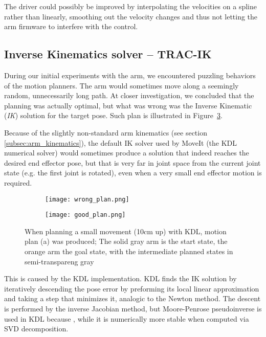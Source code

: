\documentclass[buriama8_dp.tex]{subfiles}
\begin{document}
The driver could possibly be improved by interpolating the velocities on a spline rather than linearly, smoothing out the velocity changes and thus not letting the arm firmware to interfere with the control.

\subsection{Inverse Kinematics solver -- TRAC-IK}
\label{subsec:tracik}

During our initial experiments with the arm, we encountered puzzling behaviors of the motion planners. The arm would sometimes move along a seemingly random, unnecessarily long path. At closer investigation, we concluded that the planning was actually optimal, but what was wrong was the Inverse Kinematic (\emph{IK}) solution for the target pose. Such plan is illustrated in Figure~\ref{fig:wrong_planning}.

Because of the slightly non-standard arm kinematics (see section \ref{subsec:arm_kinematics}), the default IK solver used by MoveIt (the KDL numerical solver) would sometimes produce a solution that indeed reaches the desired end effector pose, but that is very far in joint space from the current joint state (e.g. the first joint is rotated), even when a very small end effector motion is required.

\begin{figure}[htp]
  \centering
  \begin{subfigure}[t]{0.49\textwidth}
    \texttt{[image: wrong\_plan.png]}
    \caption{}
    \label{fig:wron_plan}
  \end{subfigure}
  \begin{subfigure}[t]{0.49\textwidth}
    \texttt{[image: good\_plan.png]}
    \caption{}
    \label{fig:wrong_joint}
  \end{subfigure}

  \caption[Non-optimal motion plan]{When planning a small movement (10cm up) with KDL, motion plan (a) was produced;  The solid gray arm is the start state, the orange arm the goal state, with the intermediate planned states in semi-transpareng gray}
  \label{fig:wrong_planning}
\end{figure}

This is caused by the KDL implementation. KDL finds the IK solution by iteratively descending the pose error by preforming its local linear approximation\cite{tracik}  and taking a step that minimizes it, analogic to the Newton method. The descent is performed by the inverse Jacobian method, but Moore-Penrose pseudoinverse is used in KDL because , while it is numerically more stable when computed via SVD decomposition.
\end{document}
